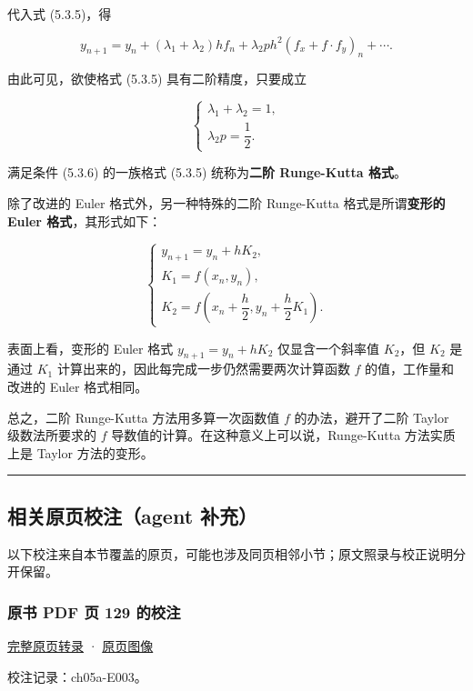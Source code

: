 \documentclass[
  10pt,
  fontset=fandol]{ctexart}
\begin{document}
代入式 (5.3.5)，得

\[
y_{n+1}=y_n+(\lambda_1+\lambda_2)hf_n+\lambda_2ph^2(f_x+f\cdot f_y)_n+\cdots.
\]

由此可见，欲使格式 (5.3.5) 具有二阶精度，只要成立

\[
\begin{cases}
\lambda_1+\lambda_2=1,\\
\lambda_2p=\dfrac{1}{2}.
\end{cases}\tag{5.3.6}
\]

满足条件 (5.3.6) 的一族格式 (5.3.5) 统称为\textbf{二阶 Runge-Kutta 格式}。

除了改进的 Euler 格式外，另一种特殊的二阶 Runge-Kutta 格式是所谓\textbf{变形的 Euler 格式}，其形式如下：

\[
\begin{cases}
y_{n+1}=y_n+hK_2,\\
K_1=f(x_n,y_n),\\
K_2=f\left(x_n+\dfrac{h}{2},y_n+\dfrac{h}{2}K_1\right).
\end{cases}
\]

表面上看，变形的 Euler 格式 \(y_{n+1}=y_n+hK_2\) 仅显含一个斜率值 \(K_2\)，但 \(K_2\) 是通过 \(K_1\) 计算出来的，因此每完成一步仍然需要两次计算函数 \(f\) 的值，工作量和改进的 Euler 格式相同。

总之，二阶 Runge-Kutta 方法用多算一次函数值 \(f\) 的办法，避开了二阶 Taylor 级数法所要求的 \(f\) 导数值的计算。在这种意义上可以说，Runge-Kutta 方法实质上是 Taylor 方法的变形。

\begin{center}\rule{0.5\linewidth}{0.5pt}\end{center}

\subsection{相关原页校注（agent 补充）}\label{ux76f8ux5173ux539fux9875ux6821ux6ce8agent-ux8865ux5145}

以下校注来自本节覆盖的原页，可能也涉及同页相邻小节；原文照录与校正说明分开保留。

\subsubsection{原书 PDF 页 129 的校注}\label{ux539fux4e66-pdf-ux9875-129-ux7684ux6821ux6ce8}

\href{../pages/pdf-129.md}{完整原页转录} · \href{../../source-images/pdf-129.jpeg}{原页图像}

校注记录：ch05a-E003。
\end{document}
